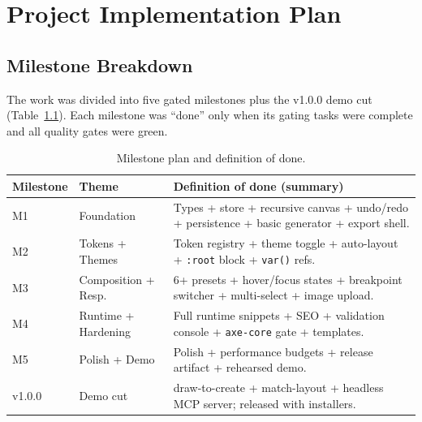 
\chapter{Project Implementation Plan}
\label{ch:plan}

\section{Milestone Breakdown}
The work was divided into five gated milestones plus the v1.0.0 demo cut
(Table~\ref{tab:milestones}). Each milestone was ``done'' only when its gating
tasks were complete and all quality gates were green.

\begin{table}[H]
  \centering
  \caption{Milestone plan and definition of done.}
  \label{tab:milestones}
  \begin{tabularx}{\linewidth}{@{}l l X@{}}
    \toprule
    \textbf{Milestone} & \textbf{Theme} & \textbf{Definition of done (summary)} \\
    \midrule
    M1 & Foundation            & Types + store + recursive canvas + undo/redo + persistence + basic generator + export shell. \\
    M2 & Tokens + Themes       & Token registry + theme toggle + auto-layout + \texttt{:root} block + \texttt{var()} refs. \\
    M3 & Composition + Resp.   & 6+ presets + hover/focus states + breakpoint switcher + multi-select + image upload. \\
    M4 & Runtime + Hardening   & Full runtime snippets + SEO + validation console + \texttt{axe-core} gate + templates. \\
    M5 & Polish + Demo         & Polish + performance budgets + release artifact + rehearsed demo. \\
    v1.0.0 & Demo cut          & draw-to-create + match-layout + headless MCP server; released with installers. \\
    \bottomrule
  \end{tabularx}
\end{table}


